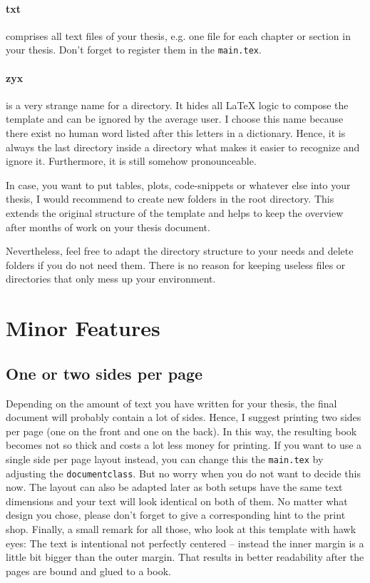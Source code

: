 \documentclass[../main.tex]{subfiles}
\begin{document}
\paragraph{txt} comprises all text files of your thesis, e.g. one file for each chapter or section in your thesis.
Don't forget to register them in the \texttt{main.tex}.

\paragraph{zyx} is a very strange name for a directory.
It hides all LaTeX logic to compose the template and can be ignored by the average user.
I choose this name because there exist no human word listed after this letters in a dictionary.
Hence, it is always the last directory inside a directory what makes it easier to recognize and ignore it.
Furthermore, it is still somehow pronounceable.

In case, you want to put tables, plots, code-snippets or whatever else into your thesis, I would recommend to create new folders in the root directory.
This extends the original structure of the template and helps to keep the overview after months of work on your thesis document.

Nevertheless, feel free to adapt the directory structure to your needs and delete folders if you do not need them.
There is no reason for keeping useless files or directories that only mess up your environment.

\newpage
\section{Minor Features}

\subsection{One or two sides per page}
Depending on the amount of text you have written for your thesis, the final document will probably contain a lot of sides.
Hence, I suggest printing two sides per page (one on the front and one on the back).
In this way, the resulting book becomes not so thick and costs a lot less money for printing.
If you want to use a single side per page layout instead, you can change this the \texttt{main.tex} by adjusting the \texttt{documentclass}.
But no worry when you do not want to decide this now.
The layout can also be adapted later as both setups have the same text dimensions and your text will look identical on both of them.
No matter what design you chose, please don't forget to give a corresponding hint to the print shop.
Finally, a small remark for all those, who look at this template with hawk eyes:
The text is intentional not perfectly centered -- instead the inner margin is a little bit bigger than the outer margin.
That results in better readability after the pages are bound and glued to a book.
\end{document}

